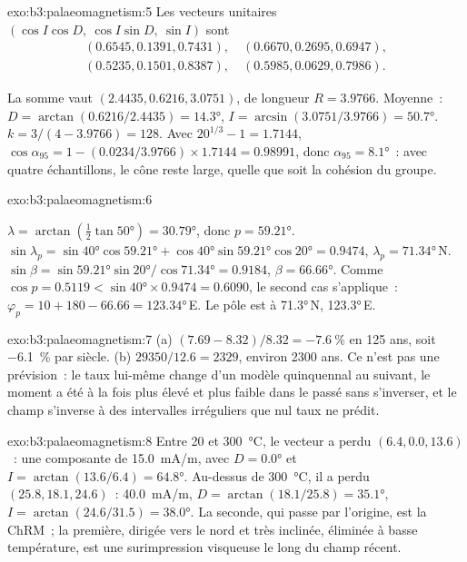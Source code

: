 \begin{solution}{exo:b3:palaeomagnetism:5}
Les vecteurs unitaires $(\cos I\cos D,\ \cos I\sin D,\ \sin I)$ sont
\begin{gather*}
  (0.6545, 0.1391, 0.7431),\quad (0.6670, 0.2695, 0.6947),\\
  (0.5235, 0.1501, 0.8387),\quad (0.5985, 0.0629, 0.7986).
\end{gather*}
{\sloppy La somme vaut $(2.4435, 0.6216, 3.0751)$, de longueur $R = 3.9766$. Moyenne~:
$D = \arctan(0.6216/2.4435) = \ang{14.3}$, $I = \arcsin(3.0751/3.9766) =
\ang{50.7}$. $k = 3/(4 - 3.9766) = 128$. Avec $20^{1/3} - 1 = 1.7144$,
$\cos\alpha_{95} = 1 - (0.0234/3.9766)\times1.7144 = 0.98991$, donc
$\alpha_{95} = \ang{8.1}$~: avec quatre échantillons, le cône reste large, quelle que soit
la cohésion du groupe.\par}
\end{solution}

\begin{solution}{exo:b3:palaeomagnetism:6}
{\sloppy $\lambda = \arctan(\tfrac12\tan\ang{50}) = \ang{30.79}$, donc $p = \ang{59.21}$.
$\sin\lambda_p = \sin\ang{40}\cos\ang{59.21} + \cos\ang{40}\sin\ang{59.21}
\cos\ang{20} = 0.9474$, $\lambda_p = \ang{71.34}$\,N. $\sin\beta =
\sin\ang{59.21}\sin\ang{20}/\cos\ang{71.34} = 0.9184$, $\beta = \ang{66.66}$.
Comme $\cos p = 0.5119 < \sin\ang{40}\times0.9474 = 0.6090$, le second cas
s'applique~: $\varphi_p = 10 + 180 - 66.66 = \ang{123.34}$\,E. Le pôle est à
\ang{71.3}\,N, \ang{123.3}\,E.\par}
\end{solution}

\begin{solution}{exo:b3:palaeomagnetism:7}
(a) $(7.69 - 8.32)/8.32 = \qty{-7.6}{\percent}$ en 125 ans, soit
\qty{-6.1}{\percent} par siècle. (b) $29350/12.6 = 2329$, environ 2300 ans.
Ce n'est pas une prévision~: le taux lui-même change d'un modèle quinquennal au
suivant, le moment a été à la fois plus élevé et plus faible dans le passé sans
s'inverser, et le champ s'inverse à des intervalles irréguliers que nul taux ne
prédit.
\end{solution}

\begin{solution}{exo:b3:palaeomagnetism:8}
Entre 20 et \qty{300}{\celsius}, le vecteur a perdu $(6.4, 0.0, 13.6)$~: une
composante de \qty{15.0}{mA/m}, avec $D = \ang{0.0}$ et
$I = \arctan(13.6/6.4) = \ang{64.8}$. Au-dessus de \qty{300}{\celsius}, il a perdu $(25.8, 18.1, 24.6)$~:
\qty{40.0}{mA/m}, $D = \arctan(18.1/25.8) = \ang{35.1}$, $I =
\arctan(24.6/31.5) = \ang{38.0}$. La seconde, qui passe par l'origine, est la
ChRM~; la première, dirigée vers le nord et très inclinée, éliminée à basse
température, est une surimpression visqueuse le long du champ récent.
\end{solution}

